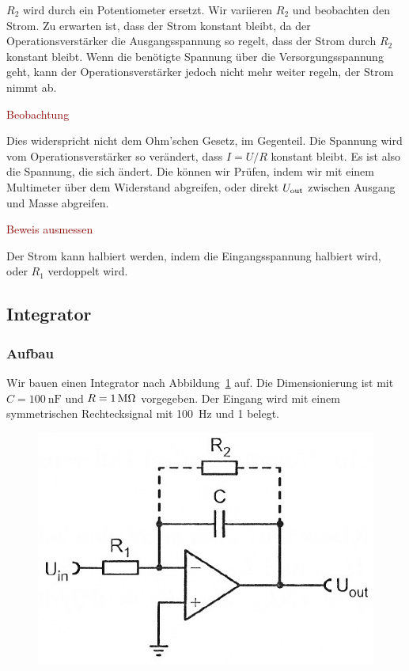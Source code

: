 $R_2$ wird durch ein Potentiometer ersetzt. Wir variieren $R_2$ und beobachten
den Strom. Zu erwarten ist, dass der Strom konstant bleibt, da der
Operationsverstärker die Ausgangsspannung so regelt, dass der Strom durch $R_2$
konstant bleibt. Wenn die benötigte Spannung über die Versorgungsspannung geht,
kann der Operationsverstärker jedoch nicht mehr weiter regeln, der Strom nimmt
ab.

\textcolor{darkred}{Beobachtung}

Dies widerspricht nicht dem Ohm'schen Gesetz, im Gegenteil. Die Spannung wird
vom Operationsverstärker so verändert, dass $I = U/R$ konstant bleibt. Es ist
also die Spannung, die sich ändert. Die können wir Prüfen, indem wir mit einem
Multimeter über dem Widerstand abgreifen, oder direkt $U_\text{out}$ zwischen Ausgang
und Masse abgreifen.

\textcolor{darkred}{Beweis ausmessen}

Der Strom kann halbiert werden, indem die Eingangsspannung halbiert wird, oder
$R_1$ verdoppelt wird.

\FloatBarrier
\subsection{Integrator}

\subsubsection{Aufbau}

Wir bauen einen Integrator nach Abbildung~\ref{fig:5_6-11} auf. Die
Dimensionierung ist mit $C = \SI{100}{\nano\farad}$ und $R = \SI1{\mega\ohm}$
vorgegeben. Der Eingang wird mit einem symmetrischen Rechtecksignal mit
\SI{100}{\hertz} und \SI{1}{\voltss} belegt.

\begin{figure}[htbp]
	\centering
	\includegraphics[width=.6\linewidth]{Anleitung/5_6-11.png}
	\caption{%
		\cite[Abbildung~5/6.11]{physik313-Anleitung}
	}
	\label{fig:5_6-11}
\end{figure}

